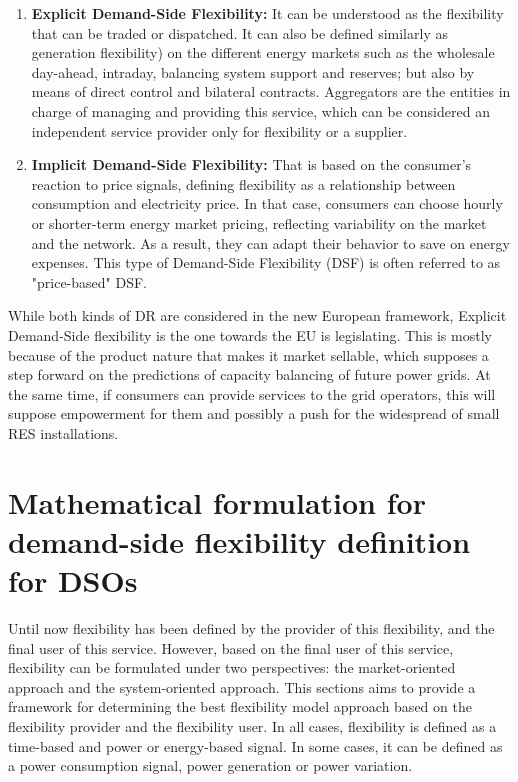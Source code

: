 \begin{enumerate}
\item \textbf{Explicit Demand-Side Flexibility:} It can be understood as the flexibility that can be traded or dispatched. It can also be defined similarly as generation flexibility) on the different energy markets such as the wholesale day-ahead, intraday, balancing system support and reserves; but also by means of direct control and bilateral contracts. Aggregators are the entities in charge of managing and providing this service, which can be considered an independent service provider only for flexibility or a supplier.
\item \textbf{Implicit Demand-Side Flexibility:} That is based on the consumer's reaction to price signals, defining flexibility as a relationship between consumption and electricity price. In that case, consumers can choose hourly or shorter-term energy market pricing, reflecting variability on the market and the network. As a result, they can adapt their behavior to save on energy expenses. This type of Demand-Side Flexibility (DSF) is often referred to as "price-based" DSF.
\end{enumerate}

While both kinds of DR are considered in the new European framework, Explicit Demand-Side flexibility is the one towards the EU is legislating. This is mostly because of the product nature that makes it market sellable, which supposes a step forward on the predictions of capacity balancing of future power grids. At the same time, if consumers can provide services to the grid operators, this will suppose empowerment for them and possibly a push for the widespread of small RES installations. 

\section{Mathematical formulation for demand-side flexibility definition for DSOs}

Until now flexibility has been defined by the provider of this flexibility, and the final user of this service. However, based on the final user of this service, flexibility can be formulated under two perspectives: the market-oriented approach and the system-oriented approach. This sections aims to provide a framework for determining the best flexibility model approach based on the flexibility provider and the flexibility user. In all cases, flexibility is defined as a time-based and power or energy-based signal. In some cases, it can be defined as a power consumption signal, power generation or power variation. 

